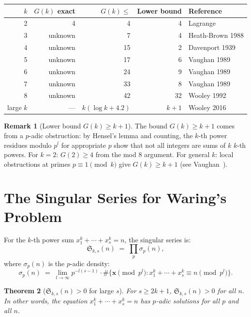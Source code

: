 \documentclass[12pt,a4paper]{amsart}
\newtheorem{theorem}{Theorem}[section]
\theoremstyle{definition}
\newtheorem{remark}[theorem]{Remark}
\begin{document}
\begin{center}
\begin{tabular}{rrrrl}
\toprule
$k$ & $G(k)$ exact & $G(k) \leq$ & Lower bound & Reference \\
\midrule
2 & 4 & 4 & 4 & Lagrange \\
3 & unknown & 7 & 4 & Heath-Brown 1988 \\
4 & unknown & 15 & 2 & Davenport 1939 \\
5 & unknown & 17 & 6 & Vaughan 1989 \\
6 & unknown & 24 & 9 & Vaughan 1989 \\
7 & unknown & 33 & 8 & Vaughan 1989 \\
8 & unknown & 42 & 32 & Wooley 1992 \\
large $k$ & — & $k(\log k + 4.2)$ & $k+1$ & Wooley 2016 \\
\bottomrule
\end{tabular}
\end{center}

\begin{remark}[Lower bound $G(k) \geq k+1$]
  The bound $G(k) \geq k+1$ comes from a $p$-adic obstruction:
  by Hensel's lemma and counting, the $k$-th power residues modulo $p^l$
  for appropriate $p$ show that not all integers are sums of $k$ $k$-th
  powers.  For $k = 2$: $G(2) \geq 4$ from the mod 8 argument.
  For general $k$: local obstructions at primes $p \equiv 1 \pmod k$
  give $G(k) \geq k + 1$ (see Vaughan~\cite{Vaughan1981}).
\end{remark}

\section{The Singular Series for Waring's Problem}
\label{sec:singular_waring}

For the $k$-th power sum $x_1^k + \cdots + x_s^k = n$, the singular
series is:
\[
  \mathfrak{S}_{k,s}(n)
  \;=\; \prod_p \sigma_p(n),
\]
where $\sigma_p(n)$ is the $p$-adic density:
\[
  \sigma_p(n) \;=\; \lim_{l \to \infty} p^{-l(s-1)}
                    \cdot \#\bigl\{\mathbf{x} \pmod{p^l} :
                           x_1^k + \cdots + x_s^k \equiv n \pmod{p^l}\bigr\}.
\]

\begin{theorem}[$\mathfrak{S}_{k,s}(n) > 0$ for large $s$]\label{thm:sing_pos}
  For $s \geq 2k + 1$, $\mathfrak{S}_{k,s}(n) > 0$ for all $n$.
  In other words, the equation $x_1^k + \cdots + x_s^k = n$ has
  $p$-adic solutions for all $p$ and all $n$.
\end{theorem}
\end{document}
